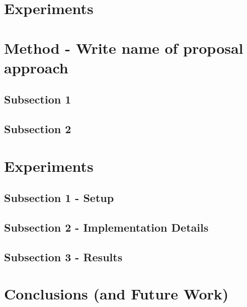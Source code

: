 \documentclass[10pt,twocolumn,letterpaper]{article}
\begin{document}
\section{Experiments}
\label{sec:experiments}


\section{Method - Write name of proposal approach}
\label{sec:method}
\subsection{Subsection 1}
\subsection{Subsection 2}

\section{Experiments}
\label{sec:experiments}
\subsection{Subsection 1 - Setup}
\subsection{Subsection 2 - Implementation Details}
\subsection{Subsection 3 - Results}

\section{Conclusions (and Future Work)}
\label{sec:conclusions}

\appendix
\end{document}
